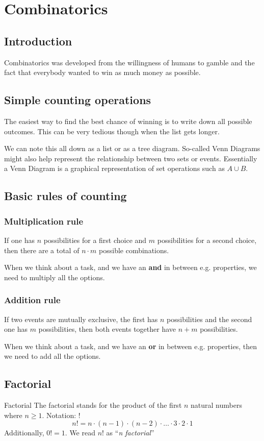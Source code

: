 \newsection
\section{Combinatorics}
\subsection{Introduction}
Combinatorics was developed from the willingness of humans to gamble and the fact that everybody wanted to win as much money as possible.

\subsection{Simple counting operations}
The easiest way to find the best chance of winning is to write down all possible outcomes. This can be very tedious though when the list gets longer.

We can note this all down as a list or as a tree diagram. So-called Venn Diagrams might also help represent the relationship between two sets or events. Essentially a Venn Diagram is a graphical representation of set operations such as $A \cup B$.


\subsection{Basic rules of counting}
\subsubsection{Multiplication rule}
If one has $n$ possibilities for a first choice and $m$ possibilities for a second choice, then there are a total of $n \cdot m$ possible combinations.

When we think about a task, and we have an \textbf{and} in between e.g. properties, we need to multiply all the options.

\subsubsection{Addition rule}
If two events are mutually exclusive, the first has $n$ possibilities and the second one has $m$ possibilities, then both events together have $n+m$ possibilities.

When we think about a task, and we have an \textbf{or} in between e.g. properties, then we need to add all the options.


\newpage
\subsection{Factorial}
\begin{definition}[]{Factorial}
    The factorial stands for the product of the first $n$ natural numbers where $n \ge 1$. Notation: $!$
    \[
        n! = n \cdot (n - 1) \cdot (n - 2) \cdot \ldots \cdot 3 \cdot 2 \cdot 1
    \]
    Additionally, $0! = 1$. We read $n!$ as ``\textit{n factorial}''
\end{definition}

